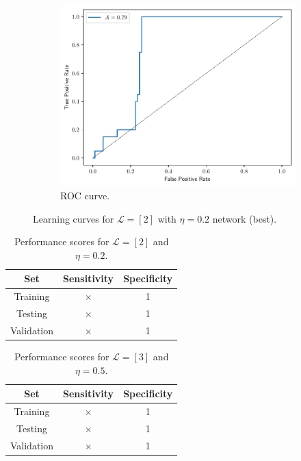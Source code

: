 \documentclass[conference]{IEEEtran}
\theoremstyle{definition}
\theoremstyle{remark}
\theoremstyle{remark}
\begin{document}
\begin{figure}
\begin{subfigure}[b]{0.3\textwidth}
    \centering \includegraphics[width=\textwidth]{figs/2-0.2-emb-roc.pdf}
    \caption{ROC curve.}
  \end{subfigure}
  \caption{Learning curves for $\mathcal{L}=[2]$ with $\eta=0.2$ network
    (best).}
\end{figure}

\begin{table}[H]
  \centering
  \caption{Performance scores for $\mathcal{L}=[2]$ and $\eta=0.2$.}
  \label{tab:L2_emb}
  \begin{tabular}{ccc}
    \hline
    \textbf{Set} & \textbf{Sensitivity} & \textbf{Specificity} \\ \hline
    Training & $\times$ & 1 \\
    Testing & $\times$ & 1 \\
    Validation & $\times$ & 1 \\ \hline
  \end{tabular}
\end{table}

\begin{table}[H]
  \centering
  \caption{Performance scores for $\mathcal{L}=[3]$ and $\eta=0.5$.}
  \label{tab:L3_emb}
  \begin{tabular}{ccc}
    \hline
    \textbf{Set} & \textbf{Sensitivity} & \textbf{Specificity} \\ \hline
    Training & $\times$ & 1 \\
    Testing & $\times$ & 1 \\
    Validation & $\times$ & 1 \\ \hline
  \end{tabular}
\end{table}
\end{document}
